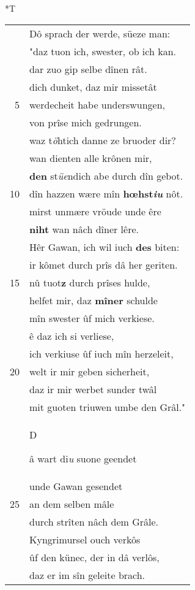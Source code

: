 \documentclass[8pt,a4paper,notitlepage]{article}
\begin{document}
\begin{table}[ht]
\begin{minipage}[t]{0.5\linewidth}
\small
\begin{center}*T
\end{center}
\begin{tabular}{rl}
 & Dô sprach der werde, süeze man:\\ 
 & "daz tuon ich, swester, ob ich kan.\\ 
 & dar zuo gip selbe dînen rât.\\ 
 & dich dunket, daz mir missetât\\ 
5 & werdecheit habe underswungen,\\ 
 & von prîse mich gedrungen.\\ 
 & waz t\textit{ö}htich danne ze bruoder dir?\\ 
 & wan dienten alle krônen mir,\\ 
 & \textbf{den} st\textit{üe}ndich abe durch dîn gebot.\\ 
10 & dîn hazzen wære mîn \textbf{hœhst\textit{iu}} nôt.\\ 
 & mirst unmære vröude unde êre\\ 
 & \textbf{niht} wan nâch dîner lêre.\\ 
 & Hêr Gawan, ich wil iuch \textbf{des} biten:\\ 
 & ir kômet durch prîs dâ her geriten.\\ 
15 & nû tuot\textbf{z} durch prîses hulde,\\ 
 & helfet mir, daz \textbf{mîner} schulde\\ 
 & mîn swester ûf mich verkiese.\\ 
 & ê daz ich si verliese,\\ 
 & ich verkiuse ûf iuch mîn herzeleit,\\ 
20 & welt ir mir geben sicherheit,\\ 
 & daz ir mir werbet sunder twâl\\ 
 & mit guoten triuwen umbe den Grâl."\\ 
 & \begin{large}D\end{large}â wart di\textit{u} suone geendet\\ 
 & unde Gawan gesendet\\ 
25 & an dem selben mâle\\ 
 & durch strîten nâch dem Grâle.\\ 
 & Kyngrimursel ouch verkôs\\ 
 & ûf den künec, der in dâ verlôs,\\ 
 & daz er im sîn geleite brach.\\ 

\end{tabular}
\end{minipage}
\end{table}
\end{document}

